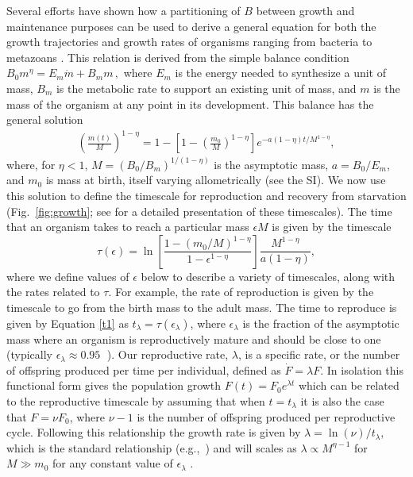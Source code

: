\documentclass[twocolumn,preprintnumbers,amsmath,amssymb,superscriptaddress]{revtex4}
\begin{document}
{Several efforts have shown how a partitioning of $B$ between growth and
maintenance purposes can be used to derive a general equation for both the
growth trajectories and growth rates of organisms ranging from bacteria to
metazoans
\citep{West:2001bv,moses2008rmo,gillooly2002esa,hou,Savage:2004ed,Kempes:2012hy}. This relation is derived from the simple balance condition 
$B_{0}m^{\eta}=E_{m}\dot{m}+B_{m}m\,,$
\citep{West:2001bv,moses2008rmo,gillooly2002esa,hou,Savage:2004ed,Kempes:2012hy} where $E_{m}$ is the energy needed to synthesize a unit of mass, $B_{m}$ is
the metabolic rate to support an existing unit of mass, and $m$ is the mass
of the organism at any point in its development.  This balance has the
general solution \citep{bettencourt,Kempes:2012hy}
\begin{eqnarray}
\label{m1}
\left(\frac{m\left(t\right)}{M}\right)^{1-\eta}\!=1\!-\!\left[1\!-\!\left(\frac{m_{0}}{M}\right)^{1\!-\!\eta}\right]e^{-a\left(1\!-\!\eta\right)t/M^{1-\eta}},
\end{eqnarray}
where, for $\eta<1$, $M=(B_{0}/B_{m})^{1/(1-\eta)}$ is the asymptotic mass,
$a=B_{0}/E_{m}$, and $m_0$ is mass at birth, itself varying allometrically
(see the SI).  We now use this solution to define the timescale for
reproduction and recovery from starvation (Fig.~\ref{fig:growth}; see
\citep{moses2008rmo} for a detailed presentation of these timescales). The
time that an organism takes to reach a particular mass $\epsilon M$ is given
by the timescale
\begin{equation}
\label{t1}
\tau\left(\epsilon\right) = \ln\left[\frac{1-\left(m_{0}/M\right)^{1-\eta}}{1-\epsilon^{1-\eta}}\right]\frac{M^{1-\eta}}{a\left(1-\eta\right)},
\end{equation}
where we define values of $\epsilon$ below to describe a variety of
timescales, along with the rates related to $\tau$.  For example, the rate of
reproduction is given by the timescale to go from the birth mass to the adult
mass. The time to reproduce is given by Equation \ref{t1} as
$t_{\lambda}=\tau\left(\epsilon_{\lambda}\right)$, where $\epsilon_{\lambda}$
is the fraction of the asymptotic mass where an organism is reproductively
mature and should be close to one (typically
$\epsilon_{\lambda}\approx0.95\;$ \citep{West:2001bv}). Our reproductive
rate, $\lambda$, is a specific rate, or the number of offspring produced per
time per individual, defined as $\dot{F} = \lambda F$. In isolation this
functional form gives the population growth
$F\left(t\right) = F_{0}e^{\lambda t}$ which can be related to the
reproductive timescale by assuming that when $t=t_{\lambda}$ it is also the
case that $F=\nu F_{0}$, where $\nu-1$ is the number of offspring produced
per reproductive cycle. Following this relationship the growth rate is given
by $\lambda=\ln\left(\nu\right)/t_{\lambda}$, which is the standard
relationship (e.g.,~\cite{Savage:2004ed}) and will scales as
$\lambda\propto M^{\eta-1}$ for $M\gg m_{0}$ for any constant value of
$\epsilon_{\lambda}$
\citep{West:2001bv,moses2008rmo,gillooly2002esa,hou,Kempes:2012hy}.


}
\end{document}

